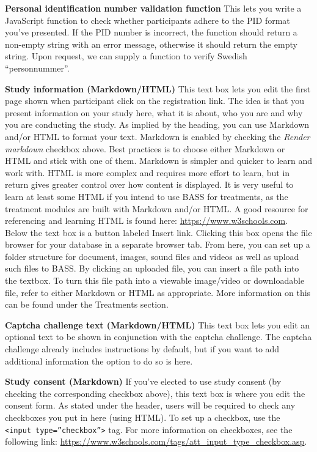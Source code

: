 \documentclass[
]{book}
\begin{document}
\textbf{Personal identification number validation function}
This lets you write a JavaScript function to check whether participants adhere to the PID format you've presented. If the PID number is incorrect, the function should return a non-empty string with an error message, otherwise it should return the empty string. Upon request, we can supply a function to verify Swedish ``personnummer''.

\textbf{Study information (Markdown/HTML)}
This text box lets you edit the first page shown when participant click on the registration link. The idea is that you present information on your study here, what it is about, who you are and why you are conducting the study.
As implied by the heading, you can use Markdown and/or HTML to format your text. Markdown is enabled by checking the \emph{Render markdown} checkbox above. Best practices is to choose either Markdown or HTML and stick with one of them. Markdown is simpler and quicker to learn and work with. HTML is more complex and requires more effort to learn, but in return gives greater control over how content is displayed.
It is very useful to learn at least some HTML if you intend to use BASS for treatments, as the treatment modules are built with Markdown and/or HTML.
A good resource for referencing and learning HTML is found here: \url{https://www.w3schools.com}.
Below the text box is a button labeled Insert link. Clicking this box opens the file browser for your database in a separate browser tab. From here, you can set up a folder structure for document, images, sound files and videos as well as upload such files to BASS. By clicking an uploaded file, you can insert a file path into the textbox. To turn this file path into a viewable image/video or downloadable file, refer to either Markdown or HTML as appropriate. More information on this can be found under the Treatments section.

\textbf{Captcha challenge text (Markdown/HTML)}
This text box lets you edit an optional text to be shown in conjunction with the captcha challenge. The captcha challenge already includes instructions by default, but if you want to add additional information the option to do so is here.

\textbf{Study consent (Markdown)}
If you've elected to use study consent (by checking the corresponding checkbox above), this text box is where you edit the consent form. As stated under the header, users will be required to check any checkboxes you put in here (using HTML). To set up a checkbox, use the \texttt{\textless{}input\ type=”checkbox”\textgreater{}} tag. For more information on checkboxes, see the following link: \url{https://www.w3schools.com/tags/att_input_type_checkbox.asp}.
\end{document}
